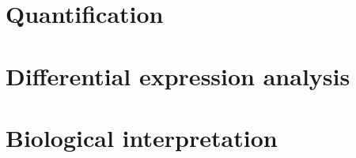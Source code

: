 \section{Quantification}

\section{Differential expression analysis}

\section{Biological interpretation}
